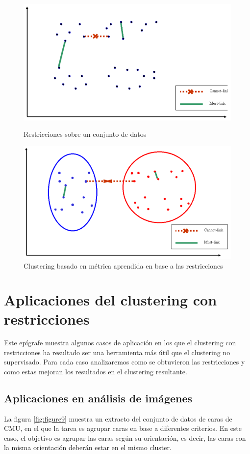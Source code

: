 \begin{figure}[bth]
	\myfloatalign
	{\includegraphics[width=.6\linewidth]{imagenes/c3/InputInstancesAndConst2}
	\caption{Restricciones sobre un conjunto de datos \cite{Survey:2007}} \label{fig:figure7}
	}
	{\includegraphics[width=.6\linewidth]{imagenes/c3/MetricaAprendida}
	\caption{Clustering basado en métrica aprendida en base a las restricciones \cite{Survey:2007}} \label{fig:figure8}
	}
\end{figure}

\section{Aplicaciones del clustering con restricciones} 

Este epígrafe muestra algunos casos de aplicación en los que el clustering con restricciones ha resultado ser una herramienta más útil que el clustering no supervisado. Para cada caso analizaremos como se obtuvieron las restricciones y como estas mejoran los resultados en el clustering resultante. 

\subsection{Aplicaciones en análisis de imágenes}

La figura \ref{fig:figure9} muestra un extracto del conjunto de datos de caras de  \acf{CMU}, en el que la tarea es agrupar caras en base a diferentes criterios. En este caso, el objetivo es agrupar las caras según su orientación, es decir, las caras con la misma orientación deberán estar en el mismo cluster.

